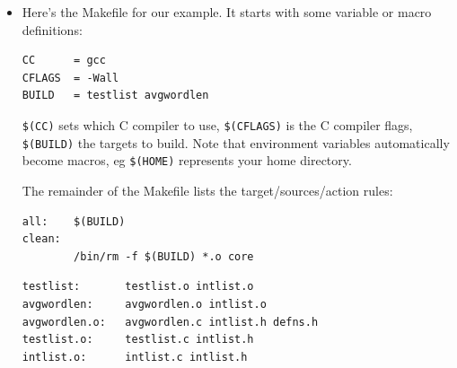 \documentclass[handout]{beamer}
\begin{document}
\begin{frame}[fragile]

\begin{itemize}
\item
    Here's the Makefile for our example.  It starts with some \alert{variable} or \alert{macro}
    definitions:
\small
\begin{verbatim}
CC      = gcc
CFLAGS  = -Wall
BUILD   = testlist avgwordlen
\end{verbatim}

\verb+$(CC)+ sets which C compiler to use,
\verb+$(CFLAGS)+ is the C compiler flags, \verb+$(BUILD)+ the targets to build.
Note that environment variables automatically become macros, eg \verb+$(HOME)+
represents your home directory.

\pitem
The remainder of the Makefile lists the target/sources/action rules:

\begin{verbatim}
all:    $(BUILD)
clean:
        /bin/rm -f $(BUILD) *.o core
\end{verbatim}

\pause
\begin{verbatim}
testlist:       testlist.o intlist.o
avgwordlen:     avgwordlen.o intlist.o
avgwordlen.o:   avgwordlen.c intlist.h defns.h
testlist.o:     testlist.c intlist.h
intlist.o:      intlist.c intlist.h
\end{verbatim}

\end{itemize}

\end{frame}
\end{document}
